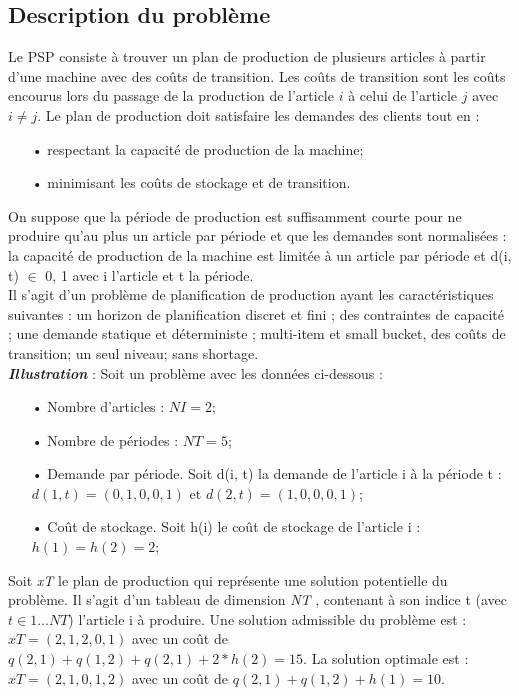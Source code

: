 \documentclass[12pt,a4paper]{article}
\begin{document}
	\subsection{Description du problème}

		\label{sec:problem_description}
		Le PSP consiste à trouver un plan de production de plusieurs articles à partir d’une machine avec des coûts de transition. Les coûts de transition sont les coûts encourus lors du passage de la production de l’article $i$ à celui de l’article $j$ avec $i \neq j$. Le plan de production doit satisfaire les demandes des clients tout en :
	\begin{itemize}
		\item[•] respectant la capacité de production de la machine;
		\item[•] minimisant les coûts de stockage et de transition.
	\end{itemize}
	\hspace*{.5cm} On suppose que la période de production est suffisamment courte pour ne produire qu’au plus un article par période et que les demandes sont normalisées : la capacité de production de la machine est limitée à un article par
période et d(i, t) $ \in $ {0, 1} avec i l’article et t la période.\\
	\hspace*{.5cm} Il s’agit d’un problème de planification de production ayant les caractéristiques suivantes : un horizon de planification discret et fini ; des contraintes de capacité ; une demande statique et déterministe ; multi-item et small bucket, des coûts de transition; un seul niveau; sans shortage.\\

	\textbf{\textsl{Illustration}} : Soit un problème avec les données ci-dessous : \\
	\begin{itemize}
		\item[•] Nombre d’articles : $NI = 2$;
		\item[•] Nombre de périodes : $NT = 5$;
		\item[•] Demande par période. Soit d(i, t) la demande de l’article i à la période t : $d(1, t) = (0, 1, 0, 0, 1)$ et $d(2, t) = (1, 0, 0, 0, 1)$;
		\item[•] Coût de stockage. Soit h(i) le coût de stockage de l’article i : $h(1) = h(2) = 2$;
	\end{itemize}
	Soit \emph{xT} le plan de production qui représente une solution potentielle du problème. Il s’agit d’un tableau de dimension \emph{NT} , contenant à son indice t (avec $t  \in  {1...NT}$) l’article i à produire. Une solution admissible du problème est : $ xT = (2, 1, 2, 0, 1)$ avec un coût de $ q(2, 1) + q(1, 2) + q(2, 1) + 2 * h(2) = 15 $. La solution optimale est : $ xT = (2, 1, 0, 1, 2)$ avec un coût de $q(2, 1) + q(1, 2) + h(1) = 10$.
		
\end{document}
